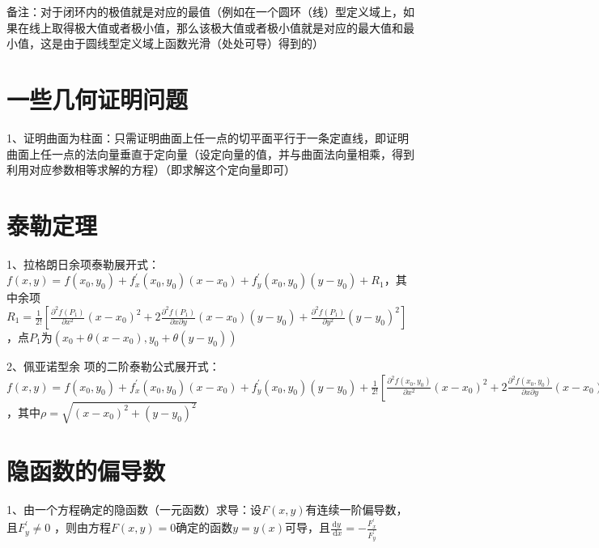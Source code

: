 备注：对于闭环内的极值就是对应的最值（例如在一个圆环（线）型定义域上，如果在线上取得极大值或者极小值，那么该极大值或者极小值就是对应的最大值和最小值，这是由于圆线型定义域上函数光滑（处处可导）得到的）

\section{一些几何证明问题}

1、证明曲面为柱面：只需证明曲面上任一点的切平面平行于一条定直线，即证明曲面上任一点的法向量垂直于定向量（设定向量的值，并与曲面法向量相乘，得到利用对应参数相等求解的方程）（即求解这个定向量即可）

\section{泰勒定理}

1、拉格朗日余项泰勒展开式：$f(x, y)=f\left(x_{0}, y_{0}\right)+f_{x}^{\prime}\left(x_{0}, y_{0}\right)\left(x-x_{0}\right)+f_{y}^{\prime}\left(x_{0}, y_{0}\right)\left(y-y_{0}\right)+R_{1}$，其中余项$R_{1}=\frac{1}{2 !}[\frac{\partial^{2} f\left(P_{1}\right)}{\partial x^{2}}\left(x-x_{0}\right)^{2}+2 \frac{\partial^{2} f\left(P_{1}\right)}{\partial x \partial y}\left(x-x_{0}\right)\left(y-y_{0}\right)+\frac{\partial^{2} f\left(P_{1}\right)}{\partial y^{2}}\left(y-y_{0}\right)^{2}]$，点$P_{1}$为$\left(x_{0}+\theta\left(x-x_{0}\right), y_{0}+\theta\left(y-y_{0}\right)\right)$

2、佩亚诺型余 项的二阶泰勒公式展开式：$f(x, y)=f\left(x_{0}, y_{0}\right)+f_{x}^{\prime}\left(x_{0}, y_{0}\right)\left(x-x_{0}\right)+f_{y}^{\prime}\left(x_{0}, y_{0}\right)\left(y-y_{0}\right)+\frac{1}{2 !}[\frac{\partial^{2} f\left(x_{0}, y_{0}\right)}{\partial x^{2}}\left(x-x_{0}\right)^{2}+2 \frac{\partial^{2} f\left(x_{0}, y_{0}\right)}{\partial x \partial y}\left(x-x_{0}\right)\left(y-y_{0}\right)+\frac{\partial^{2} f\left(x_{0}, y_{0}\right)}{\partial y^{2}}\left(y-y_{0}\right)^{2}]+o\left(\rho^{2}\right)$，其中$\rho=\sqrt{\left(x-x_{0}\right)^{2}+\left(y-y_{0}\right)^{2}}$

\section{隐函数的偏导数}

1、由一个方程确定的隐函数（一元函数）求导：设$F(x, y)$有连续一阶偏导数，且$F_{y}^{\prime} \neq 0$ ，则由方程$F(x, y)=0$确定的函数$y=y(x)$可导，且$\frac{\mathrm{d} y}{\mathrm{~d} x}=-\frac{F_{x}^{\prime}}{F_{y}^{\prime}}$


